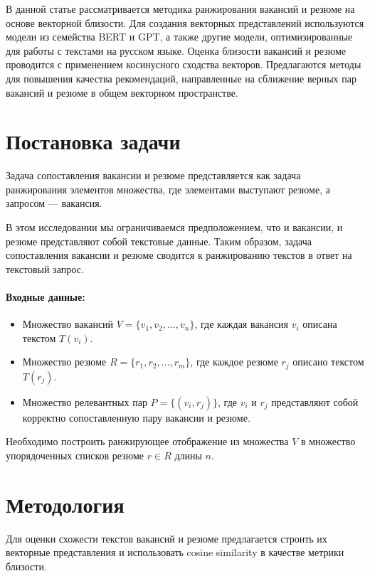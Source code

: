 \documentclass{article}
\begin{document}
В данной статье рассматривается методика ранжирования вакансий и резюме на основе векторной близости. Для создания векторных представлений используются модели из семейства BERT и GPT, а также другие модели, оптимизированные для работы с текстами на русском языке. Оценка близости вакансий и резюме проводится с применением косинусного сходства векторов. Предлагаются методы для повышения качества рекомендаций, направленные на сближение верных пар вакансий и резюме в общем векторном пространстве.



\section{Постановка задачи}

Задача сопоставления вакансии и резюме представляется как задача ранжирования элементов множества, где элементами выступают резюме, а запросом — вакансия.

В этом исследовании мы ограничиваемся предположением, что и вакансии, и резюме представляют собой текстовые данные. Таким образом, задача сопоставления вакансии и резюме сводится к ранжированию текстов в ответ на текстовый запрос.

\paragraph{Входные данные:}

\begin{itemize}
    \item Множество вакансий \( V = \{v_1, v_2, \dots, v_n\} \), где каждая вакансия \( v_i \) описана текстом \( T(v_i) \).
    \item Множество резюме \( R = \{r_1, r_2, \dots, r_m\} \), где каждое резюме \( r_j \) описано текстом \( T(r_j) \).
    \item Множество релевантных пар \( P = \{(v_i, r_j) \} \), где \( v_i \) и \( r_j \) представляют собой корректно сопоставленную пару вакансии и резюме.
\end{itemize} 

Необходимо построить ранжирующее отображение из множества \(V\) в множество упорядоченных списков резюме \(r \in R\) длины \(n\).


\section{Методология}

Для оценки схожести текстов вакансий и резюме предлагается строить их векторные представления и использовать cosine similarity в качестве метрики близости.
\end{document}
